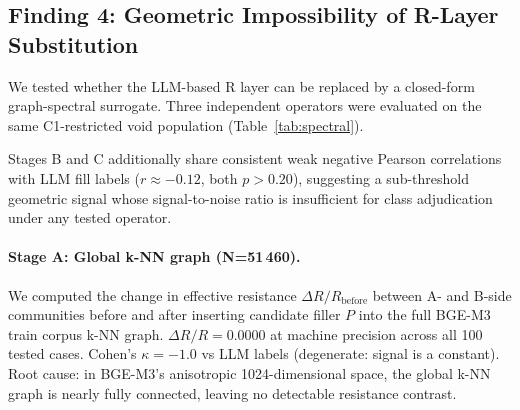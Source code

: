 \documentclass[11pt,twocolumn]{article}
\begin{document}
\subsection{Finding 4: Geometric Impossibility of R-Layer Substitution}
\label{sec:finding4}

We tested whether the LLM-based R layer can be replaced by a closed-form
graph-spectral surrogate. Three independent operators were evaluated on the same
C1-restricted void population (Table~\ref{tab:spectral}).

\begin{table}[h!]
\centering\small
\caption{Three spectral surrogates for the R layer. All fail by distinct mechanisms.
NM = non-monotone rate (signal direction wrong).
\dag\,Degenerate (constant signal): $\kappa$ not meaningful.}
\label{tab:spectral}
\end{table}

Stages B and C additionally share consistent weak negative Pearson
correlations with LLM fill labels ($r\approx -0.12$, both $p>0.20$),
suggesting a sub-threshold geometric signal whose signal-to-noise ratio
is insufficient for class adjudication under any tested operator.

\paragraph{Stage A: Global k-NN graph (N=51\,460).}
We computed the change in effective resistance $\Delta R/R_\mathrm{before}$ between
A- and B-side communities before and after inserting candidate filler $P$ into the
full BGE-M3 train corpus k-NN graph.
$\Delta R/R = 0.0000$ at machine precision across all 100 tested cases.
Cohen's $\kappa = -1.0$ vs LLM labels (degenerate: signal is a constant).
Root cause: in BGE-M3's anisotropic 1024-dimensional space, the global k-NN graph is
nearly fully connected, leaving no detectable resistance contrast.
\end{document}
